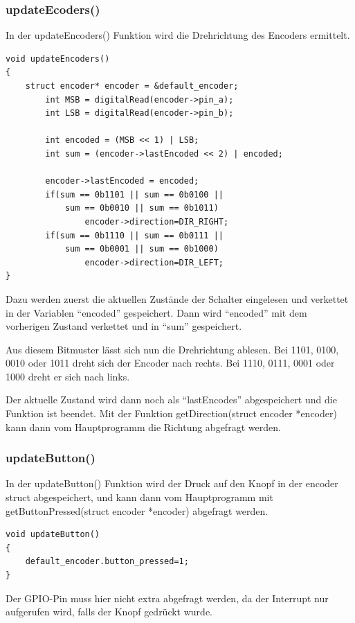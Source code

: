 \subsubsection{updateEcoders()}
In der updateEncoders() Funktion wird die Drehrichtung des Encoders ermittelt.
\begin{lstlisting}[label=encoder_update,caption=updateEncoders()]
void updateEncoders()
{
	struct encoder* encoder = &default_encoder;
        int MSB = digitalRead(encoder->pin_a);
        int LSB = digitalRead(encoder->pin_b);

        int encoded = (MSB << 1) | LSB;
        int sum = (encoder->lastEncoded << 2) | encoded;

		encoder->lastEncoded = encoded;
        if(sum == 0b1101 || sum == 0b0100 || 
        	sum == 0b0010 || sum == 0b1011) 
        		encoder->direction=DIR_RIGHT;
        if(sum == 0b1110 || sum == 0b0111 || 
        	sum == 0b0001 || sum == 0b1000) 
        		encoder->direction=DIR_LEFT;
}
\end{lstlisting}
Dazu werden zuerst die aktuellen Zustände der Schalter eingelesen und verkettet in der Variablen "`encoded"' gespeichert. Dann wird "`encoded"' mit dem vorherigen Zustand verkettet und in "`sum"' gespeichert.

Aus diesem Bitmuster lässt sich nun die Drehrichtung ablesen. Bei 1101, 0100, 0010 oder 1011 dreht sich der Encoder nach rechts.
Bei 1110, 0111, 0001 oder 1000 dreht er sich nach links.

Der aktuelle Zustand wird dann noch als "`lastEncodes"' abgespeichert und die Funktion ist beendet.
\newline
Mit der Funktion getDirection(struct encoder *encoder) kann dann vom Hauptprogramm die Richtung abgefragt werden.

\subsubsection{updateButton()}
In der updateButton() Funktion wird der Druck auf den Knopf in der encoder struct abgespeichert, und kann dann vom Hauptprogramm mit getButtonPressed(struct encoder *encoder) abgefragt werden.

\begin{lstlisting}[label=encoder_buttonr,caption=updateButton()]
void updateButton()
{
	default_encoder.button_pressed=1;
}
\end{lstlisting}
Der GPIO-Pin muss hier nicht extra abgefragt werden, da der Interrupt nur aufgerufen wird, falls der Knopf gedrückt wurde.